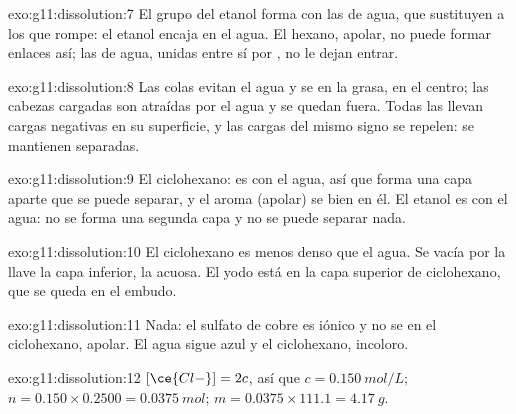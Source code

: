 \begin{solution}{exo:g11:dissolution:7}
El grupo  del etanol forma  con las
 de agua, que sustituyen a los que rompe: el etanol encaja en
el agua. El hexano, apolar, no puede formar enlaces así; las 
de agua, unidas entre sí por , no le dejan entrar.
\end{solution}

\begin{solution}{exo:g11:dissolution:8}
Las colas  evitan el agua y se  en la grasa, en el
centro; las cabezas cargadas son atraídas por el agua y se quedan fuera.
Todas las  llevan cargas negativas en su superficie, y las cargas
del mismo signo se repelen: se mantienen separadas.
\end{solution}

\begin{solution}{exo:g11:dissolution:9}
El ciclohexano: es  con el agua, así que forma una capa aparte
que se puede separar, y el aroma (apolar) se  bien en él. El
etanol es  con el agua: no se forma una segunda capa y no se
puede separar nada.
\end{solution}

\begin{solution}{exo:g11:dissolution:10}
El ciclohexano es menos denso que el agua. Se vacía por la llave la capa
inferior, la acuosa. El yodo está en la capa superior de ciclohexano,
que se queda en el embudo.
\end{solution}

\begin{solution}{exo:g11:dissolution:11}
Nada: el sulfato de cobre es iónico y no se  en el ciclohexano,
apolar. El agua sigue azul y el ciclohexano, incoloro.
\end{solution}

\begin{solution}{exo:g11:dissolution:12}
$[\ce{Cl-}] = 2c$, así que $c = \qty{0.150}{mol/L}$;
$n = 0.150 \times 0.2500 = \qty{0.0375}{mol}$;
$m = 0.0375 \times 111.1 = \qty{4.17}{g}$.
\end{solution}

